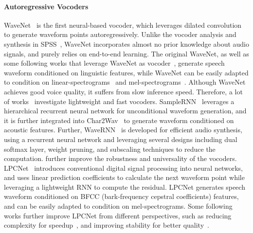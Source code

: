 \documentclass{article}
\begin{document}
\paragraph{Autoregressive Vocoders}
WaveNet~\cite{oord2016wavenet} is the first neural-based vocoder, which leverages dilated convolution to generate waveform points autoregressively. Unlike the vocoder analysis and synthesis in SPSS~\cite{fukada1992adaptive,tokuda1994mel,kawahara1999restructuring,itakura1975line,kawahara2006straight,morise2016world}, WaveNet incorporates almost no prior knowledge about audio signals, and purely relies on end-to-end learning. The original WaveNet, as well as some following works that leverage WaveNet as vocoder~\cite{arik2017deep,gibiansky2017deep}, generate speech waveform conditioned on linguistic features, while WaveNet can be easily adapted to condition on linear-spectrograms~\cite{gibiansky2017deep} and mel-spectrograms~\cite{tamamori2017speaker,ping2018deep,shen2018natural}. Although WaveNet achieves good voice quality, it suffers from slow inference speed. Therefore, a lot of works~\cite{paine2016fast,hsu2020wg,mehri2016samplernn} investigate lightweight and fast vocoders. SampleRNN~\cite{mehri2016samplernn} leverages a hierarchical recurrent neural network for unconditional waveform generation, and it is further integrated into Char2Wav~\cite{sotelo2017char2wav} to generate waveform conditioned on acoustic features. Further, WaveRNN~\cite{zhang2002efficient} is developed for efficient audio synthesis, using a recurrent neural network and leveraging several designs including dual softmax layer, weight pruning, and subscaling techniques to reduce the computation. \citet{lorenzo2019towards,paul2020speaker,jiao2021universal} further improve the robustness and universality of the vocoders. LPCNet~\cite{valin2019lpcnet,valin2019real} introduces conventional digital signal processing into neural networks, and uses linear prediction coefficients to calculate the next waveform point while leveraging a lightweight RNN to compute the residual. LPCNet generates speech waveform conditioned on BFCC (bark-frequency cepstral coefficients) features, and can be easily adapted to condition on mel-spectrograms. Some following works further improve LPCNet from different perspectives, such as reducing complexity for speedup~\cite{vipperla2020bunched,popov2020gaussian,kanagawa2020lightweight}, and improving stability for better quality~\cite{hwang2020improving}.
\end{document}

